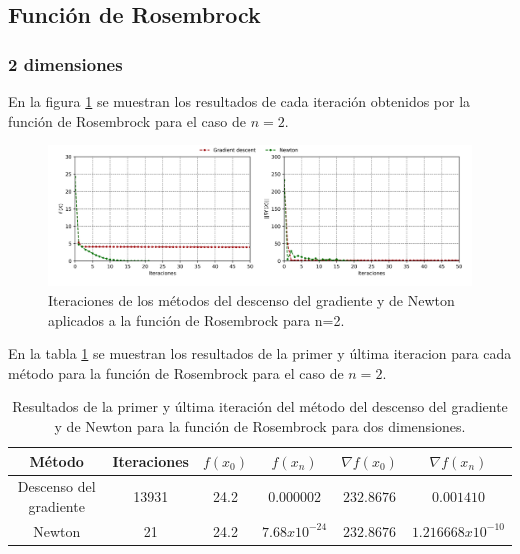 
\subsection{Función de Rosembrock}

\subsubsection{2 dimensiones}

En la figura \ref{fig:rosembrock_2} se muestran los resultados de cada iteración obtenidos por la función de Rosembrock para el caso de $n=2$.

\begin{figure}[H]
    \centering
    \includegraphics[width=17cm]{Graphics/Problema_2/rosembrock_2_predefined.png}
    \caption{Iteraciones de los métodos del descenso del gradiente y de Newton aplicados a la función de Rosembrock para n=2.}
    \label{fig:rosembrock_2}
\end{figure}

En la tabla \ref{table:rosembrock_2} se muestran los resultados de la primer y última iteracion para cada método para la función de Rosembrock para el caso de $n=2$.

\begin{table}[H]
    \centering
    \begin{tabular}{cccccc} \hline
        Método                 & Iteraciones & $f(x_0)$ & $f(x_n)$        & $\nabla f(x_0)$ & $\nabla f(x_n) $    \\ \hline
        Descenso del gradiente & 13931       & 24.2     & $0.000002$      & $232.8676$      & $0.001410$          \\
        Newton                 & 21          & 24.2     & $7.68x10^{-24}$ & $232.8676$      & $1.216668x10^{-10}$ \\ \hline
    \end{tabular}
    \caption{Resultados de la primer y última iteración del método del descenso del gradiente y de Newton para la función de Rosembrock para dos dimensiones.}
    \label{table:rosembrock_2}
\end{table}

